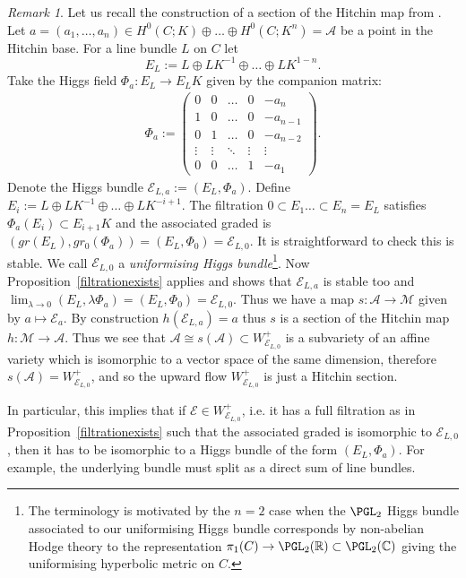 \documentclass[12pt]{article}
\numberwithin{equation}{section}
\theoremstyle{remark}
\newtheorem{remark}[theorem]{Remark}
\theoremstyle{definition}
\numberwithin{theorem}{section}
\def\beq{\begin{eqnarray}}
\def\eeq{\end{eqnarray}}
\def\calE{{\mathcal E}}
\def\C{\mathbb{C}}
\def\M{{\mathcal{M}}}
\def\calA{{\mathcal{A}}}
\def\R{\mathbb{R}}
\renewcommand{\1}{\mathbbm{1}}
\begin{document}
\begin{remark} \label{hitchinsection} Let us recall the construction of a section of the Hitchin map from \cite{hitchin-lie}.  Let ${{a}}=(a_1,\dots,a_n)\in H^0(C;K)\oplus \dots \oplus H^0(C;K^n)=\calA$ be a point in the Hitchin base. For a line bundle $L$ on $C$ let 
	$$E_L:=L\oplus LK^{-1}\oplus\dots\oplus LK^{1-n}.$$ Take the Higgs field $\Phi_{{a}}:E_L\to E_LK$ given by the companion matrix: 	\beq\label{companion}\Phi_{{a}}:=\left(\begin{array}{ccccc}  0 &0& \dots &0& -a_n\\ 1 & 0 & \dots &0&-a_{n-1}\\ 0 & 1 & \dots &0&-a_{n-2}\\ \vdots & \vdots & \ddots &\vdots &\vdots \\ 0 & 0& \dots &1 & -a_1
	\end{array}\right).\eeq  Denote the Higgs bundle $\calE_{L,{a}}:=(E_L,\Phi_{{a}})$. Define $E_i:=L\oplus LK^{-1}\oplus\dots\oplus LK^{-i+1}$. The filtration $0\subset E_1\dots \subset E_n=E_L$ satisfies $\Phi_{{a}}(E_i)\subset E_{i+1}K$ and the associated graded is $(gr(E_L),gr_0(\Phi_{ a}))=(E_L,\Phi_0)=\calE_{L,0}$. It is straightforward to check this is stable. We call $\calE_{L,0}$ a {\em uniformising Higgs bundle}\footnote{The terminology is motivated by the $n=2$ case when the $\PGL_2$ Higgs bundle associated to our uniformising Higgs bundle corresponds by  non-abelian Hodge theory to the representation $\pi_1(C)\to \PGL_2(\R)\subset \PGL_2(\C)$ giving the uniformising hyperbolic metric on $C$.}.   
	Now Proposition~\ref{filtrationexists} applies and shows that $\calE_{L,a}$ is stable too and $\lim_{\lambda\to 0} (E_L,\lambda \Phi_{ a})=(E_L,\Phi_0)=\calE_{L,0}$. Thus we have a map $s:\calA\to \M$ given by $a\mapsto \calE_a$. By construction  $h(\calE_{L,a})=a$ thus $s$ is a section of the Hitchin map $h:\M\to \calA$. Thus we see that $\calA\cong s(\calA)\subset W^+_{\calE_{L,0}}$ is a subvariety of an affine variety which is isomorphic to a vector space of the same 
	dimension, therefore $s(\calA)=W^+_{\calE_{L,0}}$, and so the upward flow $W^+_{\calE_{L,0}}$ is just a Hitchin section. 
	
	In particular, this implies that if $\calE\in W^+_{\calE_{L,0}}$, i.e. it has a full filtration as in Proposition~\ref{filtrationexists} such that the associated graded is isomorphic to $\calE_{L,0}$, then it has to be isomorphic to a Higgs bundle  of the form $(E_L,\Phi_a)$. For example, the underlying bundle must  split as a direct  sum of line bundles. 
	

\end{remark}
\end{document}
